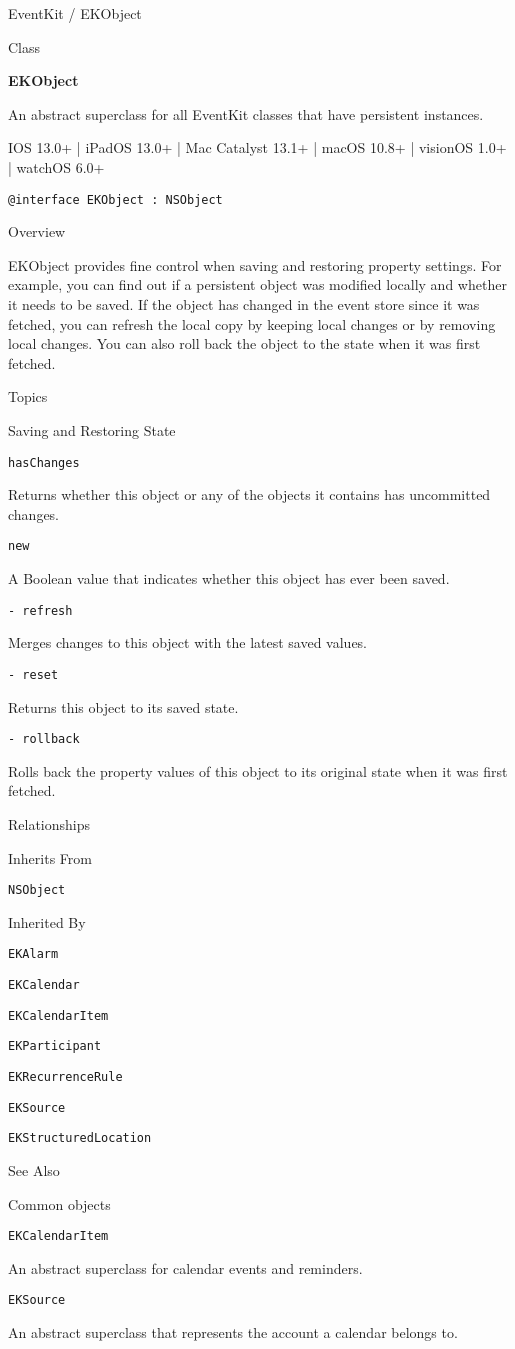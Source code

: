 \documentclass{article}
\title{}
\author{}
\date{}
\begin{document}
EventKit / EKObject

Class

\textbf{EKObject}

An abstract superclass for all EventKit classes that have persistent instances.

IOS 13.0+ | iPadOS 13.0+ | Mac Catalyst 13.1+ | macOS 10.8+ | visionOS 1.0+ | watchOS 6.0+

\texttt{@interface EKObject : NSObject}

Overview

EKObject provides fine control when saving and restoring property settings. For example, you can find out if a persistent object was modified locally and whether it needs to be saved. If the object has changed in the event store since it was fetched, you can refresh the local copy by keeping local changes or by removing local changes. You can also roll back the object to the state when it was first fetched.

Topics

Saving and Restoring State

\texttt{hasChanges}

Returns whether this object or any of the objects it contains has uncommitted changes.

\texttt{new}

A Boolean value that indicates whether this object has ever been saved.

\texttt{- refresh}

Merges changes to this object with the latest saved values.

\texttt{- reset}

Returns this object to its saved state.

\texttt{- rollback}

Rolls back the property values of this object to its original state when it was first fetched.

Relationships

Inherits From

\texttt{NSObject}

Inherited By

\texttt{EKAlarm}

\texttt{EKCalendar}

\texttt{EKCalendarItem}

\texttt{EKParticipant}

\texttt{EKRecurrenceRule}

\texttt{EKSource}

\texttt{EKStructuredLocation}

See Also

Common objects

\texttt{EKCalendarItem}

An abstract superclass for calendar events and reminders.

\texttt{EKSource}

An abstract superclass that represents the account a calendar belongs to.

\newpage
\end{document}
